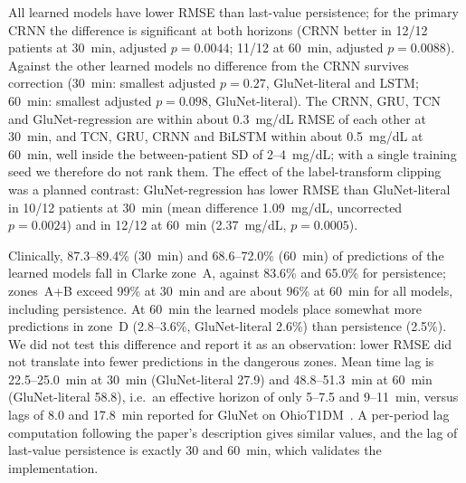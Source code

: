 \documentclass[conference]{IEEEtran}
\begin{document}
All learned models have lower RMSE than last-value persistence; for the primary CRNN the difference is significant at both horizons (CRNN better in 12/12 patients at 30~min, adjusted $p=0.0044$; 11/12 at 60~min, adjusted $p=0.0088$). Against the other learned models no difference from the CRNN survives correction (30~min: smallest adjusted $p=0.27$, GluNet-literal and LSTM; 60~min: smallest adjusted $p=0.098$, GluNet-literal). The CRNN, GRU, TCN and GluNet-regression are within about 0.3~mg/dL RMSE of each other at 30~min, and TCN, GRU, CRNN and BiLSTM within about 0.5~mg/dL at 60~min, well inside the between-patient SD of 2--4~mg/dL; with a single training seed we therefore do not rank them. The effect of the label-transform clipping was a planned contrast: GluNet-regression has lower RMSE than GluNet-literal in 10/12 patients at 30~min (mean difference 1.09~mg/dL, uncorrected $p=0.0024$) and in 12/12 at 60~min (2.37~mg/dL, $p=0.0005$).

Clinically, 87.3--89.4\% (30~min) and 68.6--72.0\% (60~min) of predictions of the learned models fall in Clarke zone~A, against 83.6\% and 65.0\% for persistence; zones~A+B exceed 99\% at 30~min and are about 96\% at 60~min for all models, including persistence. At 60~min the learned models place somewhat more predictions in zone~D (2.8--3.6\%, GluNet-literal 2.6\%) than persistence (2.5\%). We did not test this difference and report it as an observation: lower RMSE did not translate into fewer predictions in the dangerous zones. Mean time lag is 22.5--25.0~min at 30~min (GluNet-literal 27.9) and 48.8--51.3~min at 60~min (GluNet-literal 58.8), i.e.\ an effective horizon of only 5--7.5 and 9--11~min, versus lags of 8.0 and 17.8~min reported for GluNet on OhioT1DM~\cite{glunet}. A per-period lag computation following the paper's description gives similar values, and the lag of last-value persistence is exactly 30 and 60~min, which validates the implementation.
\end{document}
